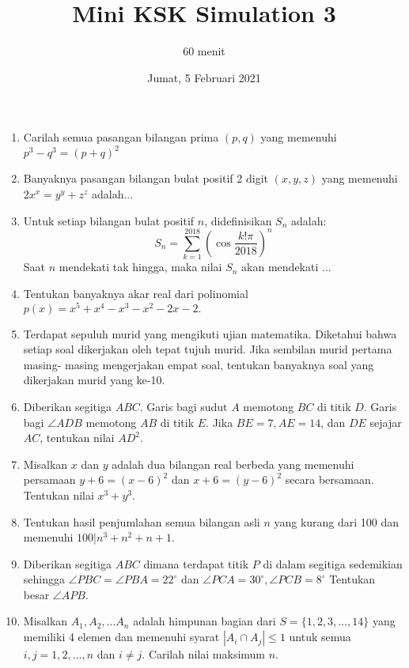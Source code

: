 \documentclass{article}
\title{Mini KSK Simulation 3}
\author{60 menit}
\date{Jumat, 5 Februari 2021}
\begin{document}
	\maketitle
	
	
	\begin{enumerate}
		\item Carilah semua pasangan bilangan prima $(p,q)$ yang memenuhi $p^3-q^3=(p+q)^2$
		
		\item
		Banyaknya pasangan bilangan bulat positif 2 digit $(x,y,z)$ yang memenuhi $2x^x=y^y+z^z$ adalah...
		
		\item
		Untuk setiap bilangan bulat positif $n$, didefinisikan $S_n$ adalah: $$ S_n = \sum_{k=1}^{2018} \left( \cos \frac{k!\pi}{2018} \right)^n$$
		Saat $n$ mendekati tak hingga, maka nilai $S_n$ akan mendekati ...
		
		
		\item
		Tentukan banyaknya akar real dari polinomial $p(x)=x^5+x^4-x^3-x^2-2x-2.$
		
		
			
		
		
		
		\item 
		Terdapat sepuluh murid yang mengikuti ujian matematika. Diketahui bahwa setiap soal dikerjakan oleh tepat tujuh murid. Jika sembilan murid pertama masing-
		masing mengerjakan empat soal, tentukan banyaknya soal yang dikerjakan murid yang ke-10.
		
		\item
		Diberikan segitiga $ABC$. Garis bagi sudut $A$ memotong $BC$ di titik $D$. Garis bagi
		$\angle ADB$ memotong $AB$ di titik $E$. Jika $BE = 7, AE = 14$, dan $DE$ sejajar $AC$,
		tentukan nilai $AD^2$.
		
		\item
		Misalkan $x$ dan $y$ adalah dua bilangan real berbeda yang memenuhi persamaan $y+6 = (x-6)^2$ dan $x+6 = (y-6)^2$ secara bersamaan. Tentukan nilai $x^3+y^3$.
		
		\item
		Tentukan hasil penjumlahan semua bilangan asli $n$ yang kurang dari 100 dan memenuhi $100|n^3+n^2+n+1$.
		
		\item
		Diberikan segitiga $ABC$ dimana terdapat titik $P$ di dalam segitiga sedemikian sehingga $\angle PBC = \angle PBA = 22^\circ$ dan $\angle PCA = 30^\circ, \angle PCB = 8^\circ$ Tentukan besar $\angle APB$.
		
		\item
		Misalkan $A_1, A_2, ... A_n$ adalah himpunan bagian dari $S = \{1,2,3,...,14 \}$ yang memiliki 4 elemen dan memenuhi syarat $|A_i \cap A_j| \le 1$ untuk semua $i,j = 1,2,...,n$ dan $i \neq j$. Carilah nilai maksimum $n$.
		
		
		
	\end{enumerate}
		
\end{document}
